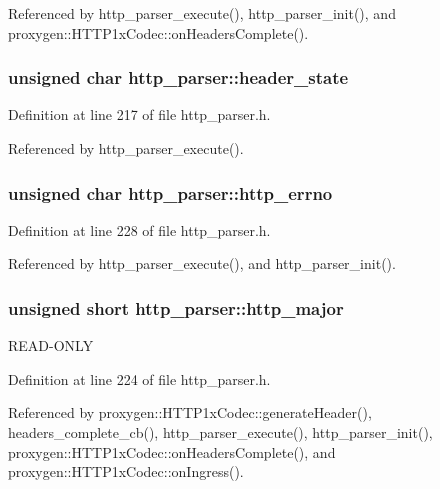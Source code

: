Referenced by http\+\_\+parser\+\_\+execute(), http\+\_\+parser\+\_\+init(), and proxygen\+::\+H\+T\+T\+P1x\+Codec\+::on\+Headers\+Complete().

\subsubsection[{header\+\_\+state}]{\setlength{\rightskip}{0pt plus 5cm}unsigned char http\+\_\+parser\+::header\+\_\+state}\label{structhttp__parser_a9d64389160150bfad8398140a38fe8e8}


Definition at line 217 of file http\+\_\+parser.\+h.



Referenced by http\+\_\+parser\+\_\+execute().

\subsubsection[{http\+\_\+errno}]{\setlength{\rightskip}{0pt plus 5cm}unsigned char http\+\_\+parser\+::http\+\_\+errno}\label{structhttp__parser_a098a1fdf277d5dadaa8e52f17d81c5e5}


Definition at line 228 of file http\+\_\+parser.\+h.



Referenced by http\+\_\+parser\+\_\+execute(), and http\+\_\+parser\+\_\+init().

\subsubsection[{http\+\_\+major}]{\setlength{\rightskip}{0pt plus 5cm}unsigned short http\+\_\+parser\+::http\+\_\+major}\label{structhttp__parser_ac994a4a8268652f5ce82de5bde5c3f9d}
R\+E\+A\+D-\/\+O\+N\+LY 

Definition at line 224 of file http\+\_\+parser.\+h.



Referenced by proxygen\+::\+H\+T\+T\+P1x\+Codec\+::generate\+Header(), headers\+\_\+complete\+\_\+cb(), http\+\_\+parser\+\_\+execute(), http\+\_\+parser\+\_\+init(), proxygen\+::\+H\+T\+T\+P1x\+Codec\+::on\+Headers\+Complete(), and proxygen\+::\+H\+T\+T\+P1x\+Codec\+::on\+Ingress().

